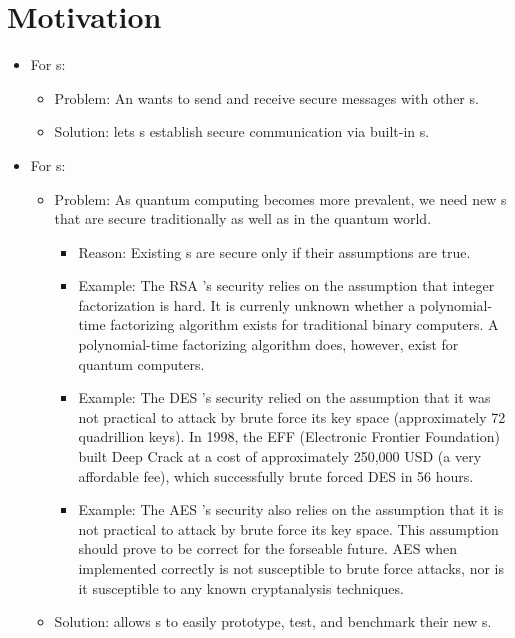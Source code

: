 


\section{Motivation}

\begin{itemize}
\item For \eu s:
  \begin{itemize}
  \item Problem: An \eu{} wants to send and receive
    secure messages with other \eu s.
  \item Solution: \cry{} lets \eu s establish
    secure communication via built-in \cs s.
  \end{itemize}
\item For \cg s:
  \begin{itemize}
  \item Problem: As quantum computing becomes
    more prevalent, we need new \cs s that are secure
    traditionally as well as in the quantum world.
    \begin{itemize}
    \item Reason: Existing \cs s are secure
      only if their assumptions are true.
    \item Example: The RSA \cs's security relies on
      the assumption that integer factorization is hard.
      It is currenly unknown whether a polynomial-time
      factorizing algorithm exists for traditional binary
      computers. A polynomial-time factorizing algorithm
      does, however, exist for quantum computers.
    \item Example: The DES \cs's security relied on the
      assumption that it was not practical to attack by
      brute force its key space
      (approximately 72 quadrillion keys). In 1998, the EFF
      (Electronic Frontier Foundation) built Deep Crack
      at a cost of approximately
      250,000 USD (a very affordable fee),
      which successfully brute
      forced DES in 56 hours.
    \item Example: The AES \cs's security also relies on
      the assumption
      that it is not practical to attack by brute force
      its key space.
      This assumption should prove to be correct for
      the forseable future.
      AES when implemented correctly is not susceptible to
      brute force attacks,
      nor is it susceptible to any known cryptanalysis
      techniques.
    \end{itemize}
  \item Solution: \cry{} allows \cg s to easily prototype,
    test, and benchmark their new \cs s.
  \end{itemize}
\end{itemize}

